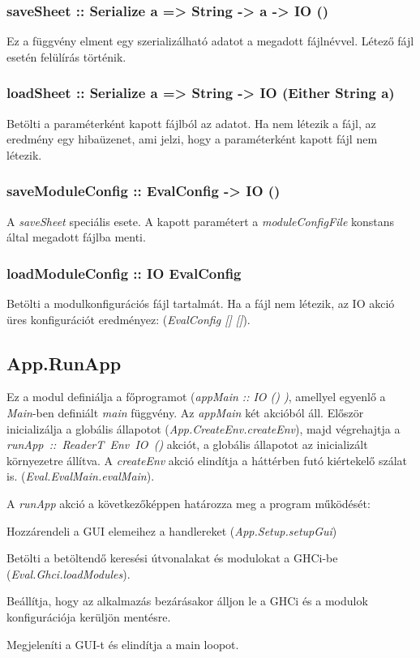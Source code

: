 \subsubsection{saveSheet :: Serialize a => String -> a -> IO ()}

Ez a függvény elment egy szerializálható adatot a megadott fájlnévvel. Létező fájl esetén felülírás történik. 

\subsubsection{loadSheet :: Serialize a => String -> IO (Either String a)}

Betölti a paraméterként kapott fájlból az adatot. Ha nem létezik a fájl, az eredmény egy hibaüzenet, ami jelzi, hogy a paraméterként kapott fájl nem létezik.

\subsubsection{saveModuleConfig :: EvalConfig -> IO ()}

A \textit{saveSheet} speciális esete. A kapott paramétert a \textit{moduleConfigFile} konstans által megadott fájlba menti.

\subsubsection{loadModuleConfig :: IO EvalConfig}

Betölti a modulkonfigurációs fájl tartalmát. Ha a fájl nem létezik, az IO akció üres konfigurációt eredményez: (\textit{EvalConfig [] []}).

\subsection{App.RunApp}

Ez a modul definiálja a főprogramot (\textit{appMain :: IO () )}, amellyel egyenlő a \textit{Main}-ben definiált \textit{main} függvény. Az \textit{appMain} két akcióból áll. Először inicializálja a globális állapotot (\textit{App.CreateEnv.createEnv}), majd végrehajtja a \mbox{\textit{runApp :: ReaderT Env IO ()}} akciót, a globális állapotot az inicializált környezetre állítva. A 
\textit{createEnv} akció elindítja a háttérben futó kiértekelő szálat is. (\textit{Eval.EvalMain.evalMain}).

A \textit{runApp} akció a következőképpen határozza meg a program működését:
\begin{compactenum}
	\item Hozzárendeli a GUI elemeihez a handlereket (\textit{App.Setup.setupGui})
	\item Betölti a betöltendő keresési útvonalakat és modulokat a GHCi-be (\textit{Eval.Ghci.loadModules}).
	\item Beállítja, hogy az alkalmazás bezárásakor álljon le a GHCi és a modulok konfigurációja kerüljön mentésre.
	\item Megjeleníti a GUI-t és elindítja a main loopot. 
\end{compactenum}

